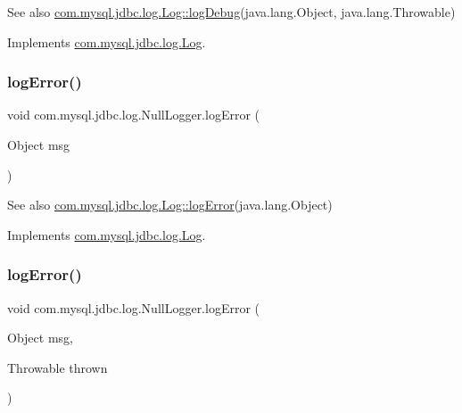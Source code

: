 \begin{DoxySeeAlso}{See also}
\mbox{\hyperlink{interfacecom_1_1mysql_1_1jdbc_1_1log_1_1_log_aa6f1e099156b6a444addba331704c2fe}{com.\+mysql.\+jdbc.\+log.\+Log\+::log\+Debug}}(java.\+lang.\+Object, java.\+lang.\+Throwable) 
\end{DoxySeeAlso}


Implements \mbox{\hyperlink{interfacecom_1_1mysql_1_1jdbc_1_1log_1_1_log_ae11c12bcf67d9681ab03e97b9098d28d}{com.\+mysql.\+jdbc.\+log.\+Log}}.

\mbox{\label{classcom_1_1mysql_1_1jdbc_1_1log_1_1_null_logger_a971d9823090761b63e867cf7950d0840}} 
\subsubsection{\texorpdfstring{log\+Error()}{logError()}\hspace{0.1cm}{\footnotesize\ttfamily [1/2]}}
{\footnotesize\ttfamily void com.\+mysql.\+jdbc.\+log.\+Null\+Logger.\+log\+Error (\begin{DoxyParamCaption}\item[{Object}]{msg }\end{DoxyParamCaption})}

\begin{DoxySeeAlso}{See also}
\mbox{\hyperlink{interfacecom_1_1mysql_1_1jdbc_1_1log_1_1_log_aefe78baa37affef138eaba105b699022}{com.\+mysql.\+jdbc.\+log.\+Log\+::log\+Error}}(java.\+lang.\+Object) 
\end{DoxySeeAlso}


Implements \mbox{\hyperlink{interfacecom_1_1mysql_1_1jdbc_1_1log_1_1_log_aefe78baa37affef138eaba105b699022}{com.\+mysql.\+jdbc.\+log.\+Log}}.

\mbox{\label{classcom_1_1mysql_1_1jdbc_1_1log_1_1_null_logger_a2488e3fd92fcca69b2bc07f10b369270}} 
\subsubsection{\texorpdfstring{log\+Error()}{logError()}\hspace{0.1cm}{\footnotesize\ttfamily [2/2]}}
{\footnotesize\ttfamily void com.\+mysql.\+jdbc.\+log.\+Null\+Logger.\+log\+Error (\begin{DoxyParamCaption}\item[{Object}]{msg,  }\item[{Throwable}]{thrown }\end{DoxyParamCaption})}

